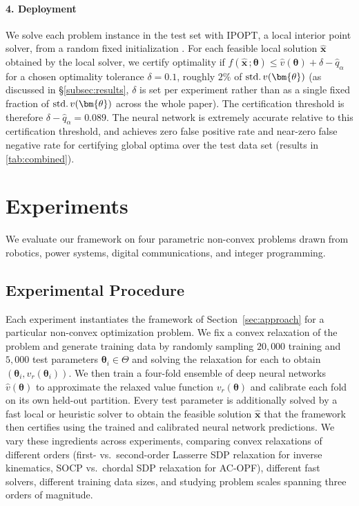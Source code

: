 \documentclass[10pt]{article} %
\theoremstyle{plain}
\theoremstyle{definition}
\theoremstyle{remark}
\begin{document}
\paragraph{4. Deployment} We solve each problem instance in the test set with IPOPT, a local interior point solver, from a random fixed initialization \citep{wachter2006implementation}. For each feasible local solution $\hat{\mathbf{x}}$ obtained by the local solver, we certify optimality if $f(\hat{\mathbf{x}}\,;\bm{\theta}) \leq \hat{v}(\bm{\theta}) + \delta - \hat{q}_\alpha$ for a chosen optimality tolerance $\delta = 0.1$, roughly $2\%$ of $\text{std.\,} v(\bm{\theta})$ (as discussed in \S\ref{subsec:results}, $\delta$ is set per experiment rather than as a single fixed fraction of $\text{std.\,} v(\bm{\theta})$ across the whole paper). The certification threshold is therefore $\delta - \hat{q}_\alpha = 0.089$. The neural network is extremely accurate relative to this certification threshold, and achieves zero false positive rate and near-zero false negative rate for certifying global optima over the test data set (results in \cref{tab:combined}{}{}).

\section{Experiments} \label{sec:experiments}

We evaluate our framework on four parametric non-convex problems drawn from robotics, power systems, digital communications, and integer programming.

\subsection*{Experimental Procedure}

Each experiment instantiates the framework of Section~\ref{sec:approach} for a particular non-convex optimization problem.
We fix a convex relaxation of the problem and generate training data by randomly sampling
$20{,}000$ training and $5{,}000$ test parameters $\bm{\theta}_i \in \Theta$ and solving the relaxation for each to obtain $(\bm{\theta}_i, v_r(\bm{\theta}_i))$. 
We then train a four-fold ensemble of deep neural networks $\hat{v}(\bm{\theta})$ to approximate the relaxed value function $v_r(\bm{\theta})$ and calibrate each fold on its own held-out partition. Every test parameter is additionally solved by a fast local or heuristic solver to obtain the feasible solution $\hat{\mathbf{x}}$ that the framework then certifies using the trained and calibrated neural network predictions. We vary these ingredients across experiments, comparing convex relaxations of different orders (first- vs.\ second-order Lasserre SDP relaxation for inverse kinematics, SOCP vs.\ chordal SDP relaxation for AC-OPF), different fast solvers, different training data sizes, and studying problem scales spanning three orders of magnitude.
\end{document}
